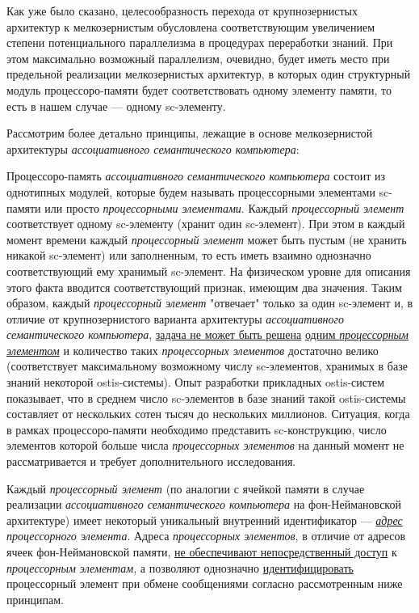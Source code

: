 Как уже было сказано, целесообразность перехода от крупнозернистых архитектур к мелкозернистым обусловлена  соответствующим увеличением степени потенциального параллелизма в процедурах переработки знаний. При этом максимально возможный параллелизм, очевидно, будет иметь место при предельной реализации мелкозернистых архитектур, в которых один структурный модуль процессоро-памяти будет соответствовать одному элементу памяти, то есть в нашем случае --- одному sc-элементу.

Рассмотрим более детально принципы, лежащие в основе мелкозернистой архитектуры \textit{ассоциативного семантического компьютера}:
\begin{textitemize}
	\item Процессоро-память \textit{ассоциативного семантического компьютера} состоит из однотипных модулей, которые будем называть процессорными элементами sc-памяти или просто \textit{процессорными элементами}. Каждый \textit{процессорный элемент} соответствует одному sc-элементу (хранит один sc-элемент). При этом в каждый момент времени каждый \textit{процессорный элемент} может быть пустым (не хранить никакой sc-элемент) или заполненным, то есть иметь взаимно однозначно соответствующий ему хранимый sc-элемент. На физическом уровне для описания этого факта вводится соответствующий признак, имеющим два значения. Таким образом, каждый \textit{процессорный элемент} "отвечает"{} только за один sc-элемент и, в отличие от крупнозернистого варианта архитектуры \textit{ассоциативного семантического компьютера}, \underline{задача не может быть решена} \underline{одним \textit{процессорным элементом}} и количество таких \textit{процессорных элементов} достаточно велико (соответствует максимальному возможному числу sc-элементов, хранимых в базе знаний некоторой ostis-системы). Опыт разработки прикладных ostis-систем показывает, что в среднем число sc-элементов в базе знаний такой ostis-системы составляет от нескольких сотен тысяч до нескольких миллионов. Ситуация, когда в рамках процессоро-памяти необходимо представить sc-конструкцию, число элементов которой больше числа \textit{процессорных элементов} на данный момент не рассматривается и требует дополнительного исследования.
	\item Каждый \textit{процессорный элемент} (по аналогии с ячейкой памяти в случае реализации \textit{ассоциативного семантического компьютера} на фон-Неймановской архитектуре) имеет некоторый уникальный внутренний идентификатор --- \textit{\underline{адрес} процессорного элемента}. Адреса \textit{процессорных элементов}, в отличие от адресов ячеек фон-Неймановской памяти, \underline{не обеспечивают непосредственный доступ} к \textit{процессорным элементам}, а позволяют однозначно \underline{идентифицировать} процессорный элемент при обмене сообщениями согласно рассмотренным ниже принципам.

\end{textitemize}
